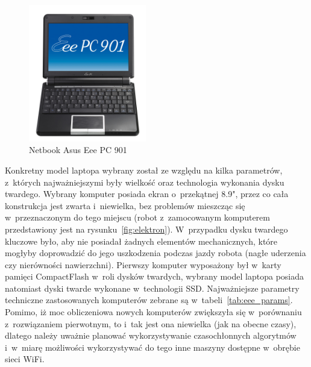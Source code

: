 \begin{figure}[h!]
\centering
\includegraphics[height=6cm]{../img/eee}
\caption{Netbook Asus Eee PC 901}
\label{fig:eee}
\end{figure}

Konkretny model laptopa wybrany został ze względu na kilka parametrów, z~których
najważniejszymi były wielkość oraz technologia wykonania dysku twardego. Wybrany
komputer posiada ekran o~przekątnej 8.9", przez co cała konstrukcja jest zwarta
i~niewielka, bez problemów mieszcząc się w~przeznaczonym do tego miejscu (robot
z~zamocowanym komputerem przedstawiony jest na rysunku~\ref{fig:elektron}). W~przypadku
dysku twardego kluczowe było, aby nie posiadał żadnych elementów mechanicznych,
które mogłyby doprowadzić do jego uszkodzenia podczas jazdy robota (nagłe uderzenia
czy nierówności nawierzchni). Pierwszy komputer wyposażony był w~karty pamięci
CompactFlash w~roli dysków twardych, wybrany model laptopa posiada natomiast
dyski twarde wykonane w~technologii SSD. Najważniejsze parametry techniczne
zastosowanych komputerów zebrane są w~tabeli~\ref{tab:eee_params}.
Pomimo, iż moc obliczeniowa nowych komputerów zwiększyła się w~porównaniu 
z~rozwiązaniem pierwotnym, to i~tak jest ona niewielka (jak na obecne czasy),
dlatego należy uważnie planować wykorzystywanie czasochłonnych algorytmów 
i~w~miarę możliwości wykorzystywać do tego inne maszyny dostępne w~obrębie sieci
WiFi.

